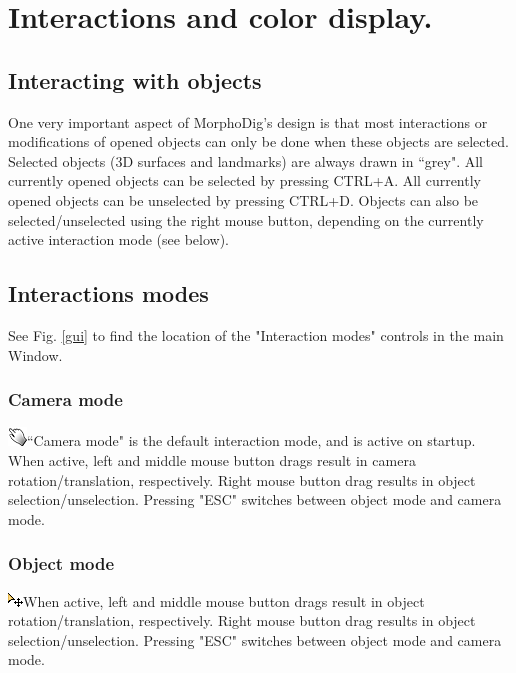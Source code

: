 \chapter{Interactions and color display. }
\minitoc  


\section{Interacting with objects}
One very important aspect of MorphoDig's design is that most interactions or modifications of opened objects can only be done when these objects are selected. 
Selected objects (3D surfaces and landmarks) are always drawn in ``grey". All currently opened objects can be selected by pressing CTRL+A. All currently opened objects can be unselected by pressing CTRL+D. Objects can also be selected/unselected using the right mouse button, depending on the currently active interaction mode (see below).



\section{Interactions modes}

See Fig. \ref{gui} to find the location of the "Interaction modes" controls in the main Window.
\subsection{Camera mode}
  \includegraphics[scale=0.7]{images/04/camera_mode.png}``Camera mode" is the default interaction mode, and is active on startup. When active, left and middle mouse button drags result in camera rotation/translation, respectively. Right mouse button drag results in object selection/unselection. Pressing "ESC" switches between object mode and camera mode.
\subsection{Object mode}
   \includegraphics[scale=0.7]{images/04/move_mode.png}When active, left and middle mouse button drags result in object rotation/translation, respectively. Right mouse button drag results in object selection/unselection. Pressing "ESC" switches between object mode and camera mode.

